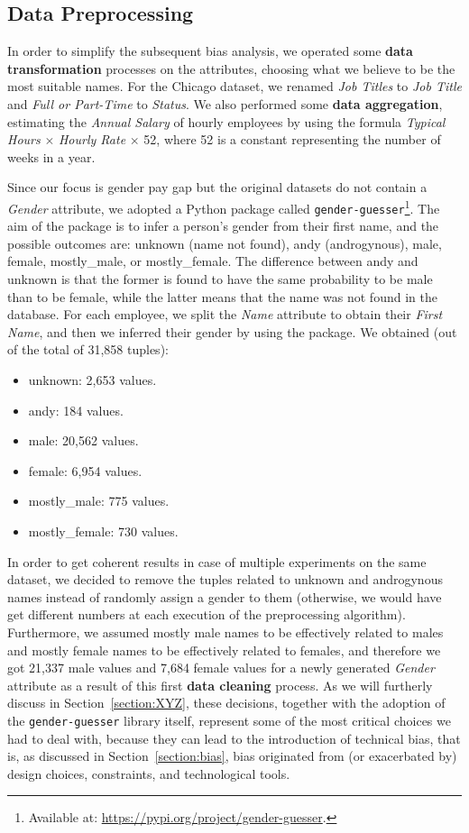 \subsection{Data Preprocessing}
\label{section:chicago_data_preprocessing}
In order to simplify the subsequent bias analysis, we operated some \textbf{data transformation} processes on the attributes, choosing what we believe to be the most suitable names. For the Chicago dataset, we renamed \textit{Job Titles} to \textit{Job Title} and \textit{Full or Part-Time} to \textit{Status}. We also performed some \textbf{data aggregation}, estimating the \textit{Annual Salary} of hourly employees by using the formula \textit{Typical Hours} \(\times\) \textit{Hourly Rate} \(\times\) 52, where 52 is a constant representing the number of weeks in a year.

Since our focus is gender pay gap but the original datasets do not contain a \textit{Gender} attribute, we adopted a Python package called \texttt{gender-guesser}\footnote{Available at: \url{https://pypi.org/project/gender-guesser}.}. The aim of the package is to infer a person's gender from their first name, and the possible outcomes are: unknown (name not found), andy (androgynous), male, female, mostly\_male, or mostly\_female. The difference between andy and unknown is that the former is found to have the same probability to be male than to be female, while the latter means that the name was not found in the database. For each employee, we split the \textit{Name} attribute to obtain their \textit{First Name}, and then we inferred their gender by using the package. We obtained (out of the total of 31,858 tuples):
\begin{itemize}
\item unknown: 2,653 values.
\item andy: 184 values.
\item male: 20,562 values.
\item female: 6,954 values.
\item mostly\_male: 775 values.
\item mostly\_female: 730 values.
\end{itemize}
In order to get coherent results in case of multiple experiments on the same dataset, we decided to remove the tuples related to unknown and androgynous names instead of randomly assign a gender to them (otherwise, we would have get different numbers at each execution of the preprocessing algorithm). Furthermore, we assumed mostly male names to be effectively related to males and mostly female names to be effectively related to females, and therefore we got 21,337 male values and 7,684 female values for a newly generated \textit{Gender} attribute as a result of this first \textbf{data cleaning} process. As we will furtherly discuss in Section~\ref{section:XYZ}, these decisions, together with the adoption of the \texttt{gender-guesser} library itself, represent some of the most critical choices we had to deal with, because they can lead to the introduction of technical bias, that is, as discussed in Section~\ref{section:bias}, bias originated from (or exacerbated by) design choices, constraints, and technological tools.

